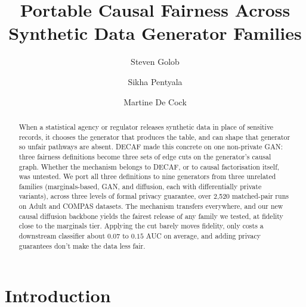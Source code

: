 \documentclass[manuscript,screen,review]{acmart}
\begin{document}
\title{Portable Causal Fairness Across \\
Synthetic Data Generator Families}

\author{Steven Golob}

\author{Sikha Pentyala}

\author{Martine De Cock}

\begin{abstract}
When a statistical agency or regulator releases synthetic data in place of
sensitive records, it chooses the generator that produces the table, and can
shape that generator so unfair pathways are absent. DECAF made this concrete
on one non-private GAN: three fairness definitions become three sets of edge
cuts on the generator's causal graph. Whether the mechanism belongs to DECAF,
or to causal factorisation itself, was untested. We port all three definitions
to nine generators from three unrelated families (marginals-based, GAN, and
diffusion, each with differentially private variants), across three levels of
formal privacy guarantee, over 2{,}520 matched-pair runs on Adult and COMPAS datasets.
The mechanism transfers everywhere, and our new causal diffusion backbone
yields the fairest release of any family we tested, at fidelity close to the
marginals tier. Applying the cut barely moves fidelity, only costs a
downstream classifier about $0.07$ to $0.15$ AUC on average, and adding privacy guarantees don't make the data less fair.
\end{abstract}

\maketitle



\section{Introduction}
\end{document}
